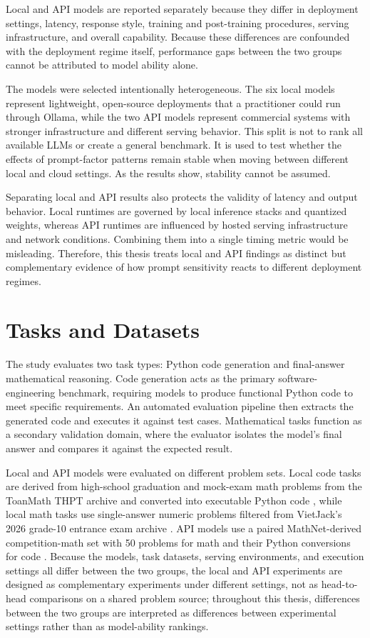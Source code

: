 Local and API models are reported separately because they differ in deployment settings, latency, response style, training and post-training procedures, serving infrastructure, and overall capability. Because these differences are confounded with the deployment regime itself, performance gaps between the two groups cannot be attributed to model ability alone.

The models were selected intentionally heterogeneous. The six local models represent lightweight, open-source deployments that a practitioner could run through Ollama, while the two API models represent commercial systems with stronger infrastructure and different serving behavior. This split is not to rank all available LLMs or create a general benchmark. It is used to test whether the effects of prompt-factor patterns remain stable when moving between different local and cloud settings. As the results show, stability cannot be assumed.

Separating local and API results also protects the validity of latency and output behavior. Local runtimes are governed by local inference stacks and quantized weights, whereas API runtimes are influenced by hosted serving infrastructure and network conditions. Combining them into a single timing metric would be misleading. Therefore, this thesis treats local and API findings as distinct but complementary evidence of how prompt sensitivity reacts to different deployment regimes.

\section{Tasks and Datasets\label{sec:tasks}}

The study evaluates two task types: Python code generation and final-answer mathematical reasoning. Code generation acts as the primary software-engineering benchmark, requiring models to produce functional Python code to meet specific requirements. An automated evaluation pipeline then extracts the generated code and executes it against test cases. Mathematical tasks function as a secondary validation domain, where the evaluator isolates the model's final answer and compares it against the expected result.

Local and API models were evaluated on different problem sets. Local code tasks are derived from high-school graduation and mock-exam math problems from the ToanMath THPT archive and converted into executable Python code \cite{toanmath2026thpt, promptframingkaggle2026}, while local math tasks use single-answer numeric problems filtered from VietJack's 2026 grade-10 entrance exam archive \cite{vietjack2026onvao10, promptframingkaggle2026}. API models use a paired MathNet-derived competition-math set with 50 problems for math and their Python conversions for code \cite{promptframingkaggle2026}. Because the models, task datasets, serving environments, and execution settings all differ between the two groups, the local and API experiments are designed as complementary experiments under different settings, not as head-to-head comparisons on a shared problem source; throughout this thesis, differences between the two groups are interpreted as differences between experimental settings rather than as model-ability rankings.

